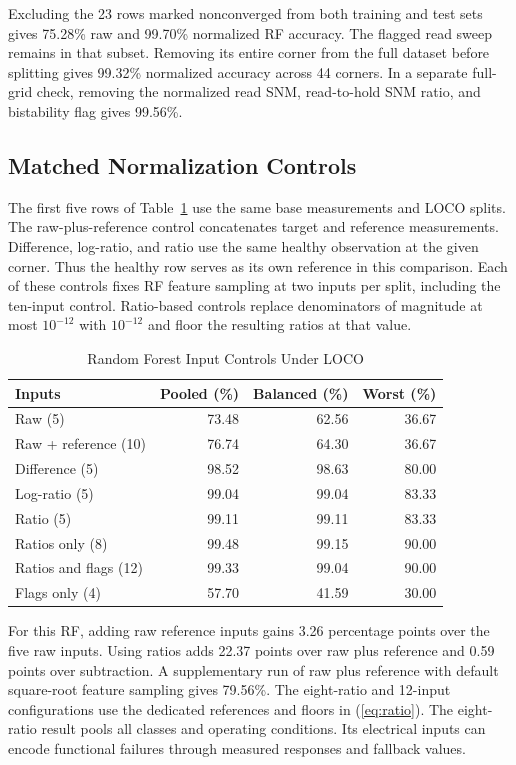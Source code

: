 \documentclass[conference,letterpaper]{IEEEtran}
\begin{document}
Excluding the 23 rows marked nonconverged from both training and test sets gives 75.28\% raw and 99.70\% normalized RF accuracy. The flagged read sweep remains in that subset. Removing its entire corner from the full dataset before splitting gives 99.32\% normalized accuracy across 44 corners. In a separate full-grid check, removing the normalized read SNM, read-to-hold SNM ratio, and bistability flag gives 99.56\%.

\subsection{Matched Normalization Controls}

The first five rows of Table~\ref{tab:ablation} use the same base measurements and LOCO splits. The raw-plus-reference control concatenates target and reference measurements. Difference, log-ratio, and ratio use the same healthy observation at the given corner. Thus the healthy row serves as its own reference in this comparison. Each of these controls fixes RF feature sampling at two inputs per split, including the ten-input control. Ratio-based controls replace denominators of magnitude at most $10^{-12}$ with $10^{-12}$ and floor the resulting ratios at that value.

\begin{table}[!t]
\caption{Random Forest Input Controls Under LOCO}
\label{tab:ablation}
\centering
\footnotesize
\setlength{\tabcolsep}{4pt}
\begin{tabular}{@{}lrrr@{}}
\toprule
Inputs & Pooled (\%) & Balanced (\%) & Worst (\%) \\
\midrule
Raw (5) & 73.48 & 62.56 & 36.67 \\
Raw + reference (10) & 76.74 & 64.30 & 36.67 \\
Difference (5) & 98.52 & 98.63 & 80.00 \\
Log-ratio (5) & 99.04 & 99.04 & 83.33 \\
Ratio (5) & 99.11 & 99.11 & 83.33 \\
\midrule
Ratios only (8) & 99.48 & 99.15 & 90.00 \\
Ratios and flags (12) & 99.33 & 99.04 & 90.00 \\
Flags only (4) & 57.70 & 41.59 & 30.00 \\
\bottomrule
\end{tabular}
\end{table}

For this RF, adding raw reference inputs gains 3.26 percentage points over the five raw inputs. Using ratios adds 22.37 points over raw plus reference and 0.59 points over subtraction. A supplementary run of raw plus reference with default square-root feature sampling gives 79.56\%. The eight-ratio and 12-input configurations use the dedicated references and floors in (\ref{eq:ratio}). The eight-ratio result pools all classes and operating conditions. Its electrical inputs can encode functional failures through measured responses and fallback values.
\end{document}
